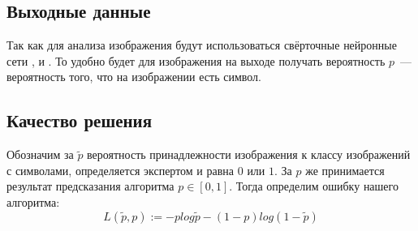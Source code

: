\documentclass[12pt,twoside]{article}
\begin{document}
\subsection{Выходные данные}
Так как для анализа изображения будут использоваться свёрточные нейронные сети \cite{img_capt}, \cite{over_feat} и \cite{pvnet}. То удобно будет для изображения на выходе получать вероятность $p$~--- вероятность того, что на изображении есть символ.
\subsection{Качество решения}
Обозначим за $\widetilde{p}$ вероятность принадлежности изображения к классу изображений с символами, определяется экспертом и равна $0$ или $1$. За $p$ же принимается результат предсказания алгоритма $p \in [0, 1]$. Тогда определим ошибку нашего алгоритма:
$$L(\widetilde{p}, p) := -p log\widetilde{p} - (1 - p)log(1 -\widetilde{p})$$
{}
   
\end{document}

